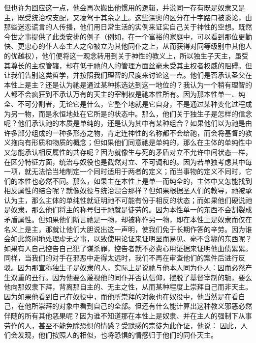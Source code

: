 但也许为回应这一点，他会再次搬出他惯用的逻辑，并说同一存有既是奴隶又是主，既受统治权支配，又凌驾于其余之上。这些深奥的区分在十字路口被谈论，由那些迷恋谎言的人传播，他们用日常生活的实例来证实自己关于神性的空想。既然今世之事提供了此类安排的例子（例如，在一个富裕的家庭中，可以看到那位更勤快、更忠心的仆人奉主人之命被立为其他同仆之上，从而获得对同等级别中其他人的优越权），他们便将这一观念转用到关于神性的教义上，所以独生子天主，虽受其尊长的主权管辖，却在低于祂的人的管理方面丝毫未受其主权者权威的阻碍。但让我们告别这类哲学，并按照我们理智的尺度来讨论这一点。他们是否承认圣父在本性上是主？还是认为祂是通过某种拣选达到这一地位的？我认为一个稍有理智的人都不会疯狂到不承认万有的天主的宰制权是祂本性所有。因为那本性单一、纯全、不可分割者，无论它是什么，它整个地就是它自身，不是通过某种变化过程成为另一物，而是永恒地处在它所是的状态中。那么，他们关于独生子是怎样的信念呢？他们承认祂的本质是单纯的，还是认为其中有某种组合？如果他们以为祂是由许多部分组成的一种多形态之物，肯定连神性的名称都不会给祂，而会将基督的教义拖向有形质和物质的概念；但如果他们同意祂是单纯的，那么在主体的单纯性中又怎能承认相反属性的共存呢？因为就像生与死的矛盾对立不允许中间状态一样，在区分特征方面，统治与奴役也是截然对立、不可调和的。因为若单独考虑其中每一项，就无法恰当地制定一个同时适用于两者的定义；而当事物的定义不同时，它们的本性也必然不同。那么，如果主在本性上是单一而纯全的，主体中又怎能找到相反属性的结合呢？就像奴役与统治混合那样？但如果根据圣人们的教导，祂被承认为主，那么主体的单纯性就证明祂不可能有份于相反的状态；而如果他们硬说祂是奴隶，那么他们将主的称号归于祂就是徒劳的。因为本性单一的东西不会割裂成矛盾属性。但如果他们断言祂是一物，却被称作另一物，即在本性上是奴隶而仅在名义上是主，那就让他们大胆说出这一声明，使我们免于长期作答的辛劳。因为谁会如此悠闲地处理虚无之事，以致使用论证来证明显而易见、毫不含糊的东西呢？如果有人自己控告自己犯了谋杀罪，控告者就不必费心用证据来证明他血债累累。同样，当我们的对手在邪恶中走得太远时，我们不再在审查他们的案件后进行反驳。因为那宣称独生子是奴隶的人，实际上是说祂与他本人同为仆人：因而必然产生双重的丑行。因为他要么蔑视他的同仆并否认信仰，摆脱了基督宰制的轭，要么他向那奴隶下拜，背离那自主的、无主之性，从而某种程度上崇拜自己而非天主。因为如果他看到自己在奴役中，而他所崇拜的对象也在奴役中，他当然是在看自己，在他所崇拜的对象中看到自己的全部。但还有什么能计算出这种教义邪恶必然伴随的所有其他恶果呢？因为谁不知道那在本性上是奴隶、并在主人的强制下从事劳作的人，甚至不能免除恐惧的情感？受默感的宗徒为此作证，他说： 因此，人们会发现，他们按照人的相似，也将恐惧的情感归于他们的同仆天主。\par

